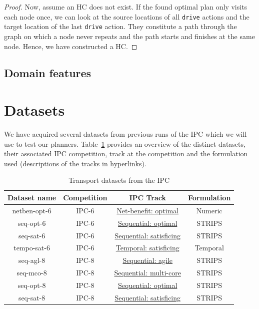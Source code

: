 \begin{proof}
Now, assume an HC does not exist. If the found optimal plan only visits each node once,
we can look at the source locations of all \verb+drive+ actions and the target
location of the last \verb+drive+ action. They constitute a path through the graph on which a node never repeats and the path starts and finishes at the same node.
Hence, we have constructed a HC.
\end{proof}

\subsection{Domain features}


\section{Datasets}

We have acquired several datasets from previous runs of the IPC which we will use to test our planners.
Table~\ref{tab:ipc-datasets} provides an overview of the distinct datasets, their associated IPC competition, track at the competition and the formulation used (descriptions of the tracks in hyperlinks).

\begin{table}[tb]
\begin{tabular}{c|c|c|c}
\textbf{Dataset name} & \textbf{Competition} & \textbf{IPC Track} & \textbf{Formulation} \\ 
\hline
\hline
netben-opt-6 & IPC-6 & \href{http://icaps-conference.org/ipc2008/deterministic/NetBenefitOptimization.html}{Net-benefit: optimal} & Numeric \\ 
seq-opt-6 & IPC-6 & \href{http://icaps-conference.org/ipc2008/deterministic/SequentialOptimization.html}{Sequential: optimal} & STRIPS \\ 
seq-sat-6 & IPC-6 & \href{http://icaps-conference.org/ipc2008/deterministic/SequentialSatisficing.html}{Sequential: satisficing} & STRIPS \\ 
tempo-sat-6 & IPC-6 & \href{http://icaps-conference.org/ipc2008/deterministic/TemporalSatisficing.html}{Temporal: satisficing} & Temporal \\ 
\hline
seq-agl-8 & IPC-8 & \href{https://helios.hud.ac.uk/scommv/IPC-14/seqagi.html}{Sequential: agile} & STRIPS \\ 
seq-mco-8 & IPC-8 & \href{https://helios.hud.ac.uk/scommv/IPC-14/seqmulti.html}{Sequential: multi-core} & STRIPS \\ 
seq-opt-8 & IPC-8 & \href{https://helios.hud.ac.uk/scommv/IPC-14/seqopt.html}{Sequential: optimal} & STRIPS \\ 
seq-sat-8 & IPC-8 & \href{https://helios.hud.ac.uk/scommv/IPC-14/seqsat.html}{Sequential: satisficing} & STRIPS \\ 
\end{tabular}
\caption{Transport datasets from the IPC}
\label{tab:ipc-datasets}
\end{table}

